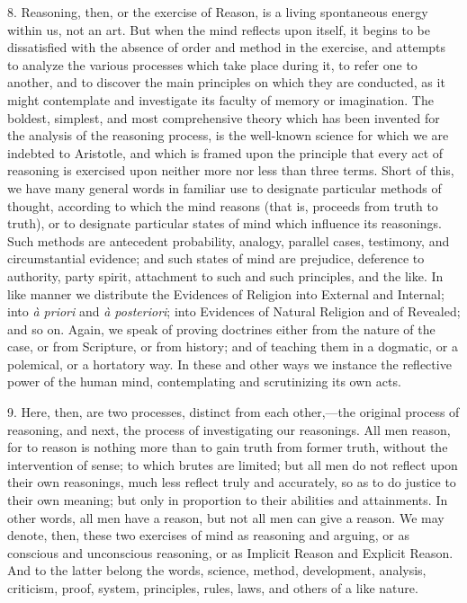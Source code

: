 8. Reasoning, then, or the exercise of Reason, is a living
spontaneous energy within us, not an art. But when the mind reflects
upon itself, it begins to be dissatisfied with the absence of order
and method in the exercise, and attempts to analyze the various
processes which take place during it, to refer one to another, and to
discover the main principles on which they are conducted, as it might
contemplate and investigate its faculty of memory or imagination. The
boldest, simplest, and most comprehensive theory which has been
invented for the analysis of the reasoning process, is the well-known
science for which we are indebted to Aristotle, and which is framed
upon the principle that every act of reasoning is exercised upon
neither more nor less than three terms. Short of this, we have many
general words in familiar use to designate particular methods of
thought, according to which the mind reasons (that is, proceeds from
truth to truth), or to designate particular states of mind which
influence its reasonings. Such methods are antecedent probability,
analogy, parallel cases, testimony, and circumstantial evidence; and
such states of mind are prejudice, deference to authority, party
spirit, attachment to such and such principles, and the like. In like
manner we distribute the Evidences of Religion into External and
Internal; into \emph{à priori} and \emph{à posteriori}; into
Evidences of Natural Religion and of Revealed; and so on. Again, we
speak of proving doctrines either from the nature of the case, or from
Scripture, or from history; and of teaching them in a dogmatic, or a
polemical, or a hortatory way. In these and other ways we instance the
reflective power of the human mind, contemplating and scrutinizing its
own acts.

9. Here, then, are two processes, distinct from each other,—the
original process of reasoning, and next, the process of investigating
our reasonings. All men reason, for to reason is nothing more than to
gain truth from former truth, without the intervention of sense; to
which brutes are limited; but all men do not reflect upon their own
reasonings, much less reflect truly and accurately, so as to do
justice to their own meaning; but only in proportion to their
abilities and attainments. In other words, all men have a reason, but
not all men can give a reason. We may denote, then, these two
exercises of mind as reasoning and arguing, or as conscious and
unconscious reasoning, or as Implicit Reason and Explicit Reason. And
to the latter belong the words, science, method, development,
analysis, criticism, proof, system, principles, rules, laws, and
others of a like nature.

